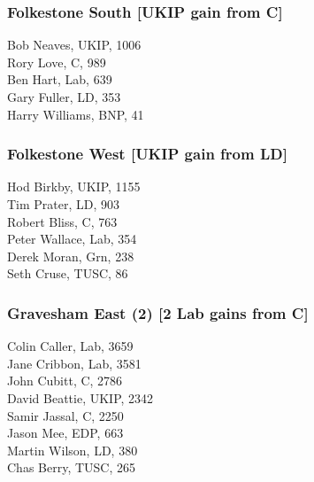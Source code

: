 \documentclass[a4paper,openany,10pt]{book}
\begin{document}
\subsubsection*{Folkestone South \hspace*{\fill}\nolinebreak[1]%
\enspace\hspace*{\fill}
[UKIP gain from C]}



Bob Neaves, UKIP, 1006\\
Rory Love, C, 989\\
Ben Hart, Lab, 639\\
Gary Fuller, LD, 353\\
Harry Williams, BNP, 41\\


\subsubsection*{Folkestone West \hspace*{\fill}\nolinebreak[1]%
\enspace\hspace*{\fill}
[UKIP gain from LD]}



Hod Birkby, UKIP, 1155\\
Tim Prater, LD, 903\\
Robert Bliss, C, 763\\
Peter Wallace, Lab, 354\\
Derek Moran, Grn, 238\\
Seth Cruse, TUSC, 86\\


\subsubsection*{Gravesham East (2) \hspace*{\fill}\nolinebreak[1]%
\enspace\hspace*{\fill}
[2 Lab gains from C]}



Colin Caller, Lab, 3659\\
Jane Cribbon, Lab, 3581\\
John Cubitt, C, 2786\\
David Beattie, UKIP, 2342\\
Samir Jassal, C, 2250\\
Jason Mee, EDP, 663\\
Martin Wilson, LD, 380\\
Chas Berry, TUSC, 265\\
\end{document}
